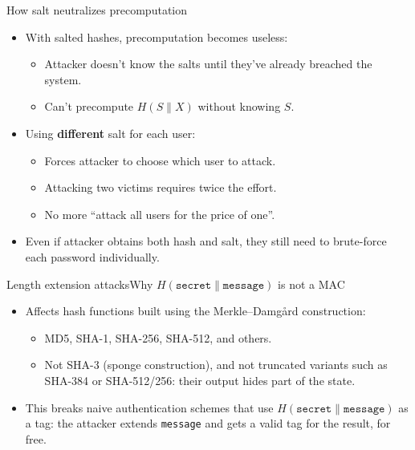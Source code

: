 \ifdefined\PRESENTATION\else\PassOptionsToClass{handout}{beamer}\fi\documentclass[aspectratio=169, lualatex]{beamer}
\begin{document}
\begin{frame}{How salt neutralizes precomputation}
	\begin{itemize}
		\item With salted hashes, precomputation becomes useless:
		      \begin{itemize}
			      \item Attacker doesn't know the salts until they've already breached the system.
			      \item Can't precompute $H(S \| X)$ without knowing $S$.
		      \end{itemize}
		\item Using \textbf{different} salt for each user:
		      \begin{itemize}
			      \item Forces attacker to choose which user to attack.
			      \item Attacking two victims requires twice the effort.
			      \item No more ``attack all users for the price of one''.
		      \end{itemize}
		\item Even if attacker obtains both hash and salt, they still need to brute-force each password individually.
	\end{itemize}
\end{frame}

\begin{frame}{Length extension attacks}{Why $H(\texttt{secret} \| \texttt{message})$ is not a MAC}
	\begin{itemize}
		\item Affects hash functions built using the Merkle--Damg\aa rd construction:
		      \begin{itemize}
			      \item MD5, SHA-1, SHA-256, SHA-512, and others.
			      \item Not SHA-3 (sponge construction), and not truncated variants such as SHA-384 or SHA-512/256: their output hides part of the state.
		      \end{itemize}
		\item This breaks naive authentication schemes that use $H(\texttt{secret} \| \texttt{message})$ as a tag: the attacker extends \texttt{message} and gets a valid tag for the result, for free.
	\end{itemize}
\end{frame}
\end{document}
